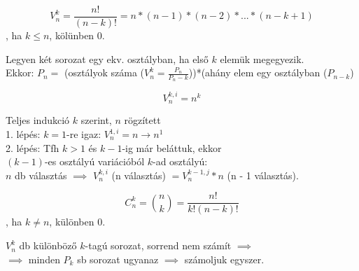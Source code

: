 \begin{frame}

\begin{tcolorbox}[title={Tétel: Variációk száma}]
$$V_n^k = \frac{n!}{(n - k)!} = n * (n - 1) * (n - 2) * ... * (n - k + 1)$$, ha $k \leq n$, kölünben 0.

\end{tcolorbox}

\begin{tcolorbox}[title={Bizonyítás}]
Legyen két sorozat egy ekv. osztályban, ha első $k$ elemük megegyezik.\\
Ekkor: $P_n = $ (osztályok száma ($V_n^k = \frac{P_n}{P_n - k}$))*(ahány elem egy osztályban ($P_{n - k}$)


\end{tcolorbox}

\end{frame}

\begin{frame}

\begin{tcolorbox}[title={Tétel: Ismétléses variációk száma}]
$$V_n^{k, i} = n^k$$

\end{tcolorbox}

\begin{tcolorbox}[title={Bizonyítás}]
Teljes indukció $k$ szerint, $n$ rögzített\\
1. lépés: $k = 1$-re igaz: $V_n^{1, i} = n \rightarrow n^1$\\
2. lépés: Tfh $k > 1$ és $k - 1$-ig már beláttuk, ekkor\\
$(k - 1)$-es osztályú variációból $k$-ad osztályú:\\
$n$ db választás $\implies$ $V_n^{k, i}$ (n választás) $= V_n^{k - 1, j} * n$ (n - 1 választás).

\end{tcolorbox}

\end{frame}

\begin{frame}

\begin{tcolorbox}[title={Tétel: Kombinációk száma}]
$$C_n^k = {{n}\choose{k}} = \frac{n!}{k!(n - k)!} $$, ha $k \neq n$, különben 0.

\end{tcolorbox}

\begin{tcolorbox}[title={Bizonyítás}]
$V_n^k$ db különböző $k$-tagú sorozat, sorrend nem számít $\implies$\\
$\implies$ minden $P_k$ sb sorozat ugyanaz $\implies$ számoljuk egyszer.\\

\end{tcolorbox}

\end{frame}

